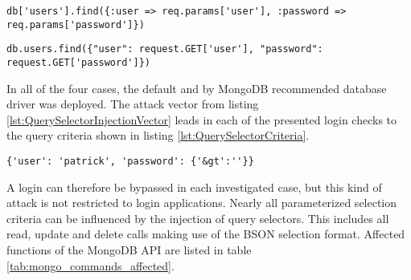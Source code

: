 \begin{lstlisting}[caption={Vulnerable Ruby example for query selector injection on MongoDB}, label={lst:RubyQuerySelectorInjection}]
db['users'].find({:user => req.params['user'], :password => req.params['password']})
\end{lstlisting}

\begin{lstlisting}[caption={Vulnerable Python example for query selector injection on MongoDB}, label={lst:PythonQuerySelectorInjection}]
db.users.find({"user": request.GET['user'], "password": request.GET['password']})
\end{lstlisting}

In all of the four cases, the default and by MongoDB recommended database driver was deployed. The attack vector from listing \ref{lst:QuerySelectorInjectionVector} leads in each of the presented login checks to the query criteria shown in listing \ref{lst:QuerySelectorCriteria}. \\

\begin{lstlisting}[caption={Resulting query of query selector injection}, label={lst:QuerySelectorCriteria}]
{'user': 'patrick', 'password': {'&gt':''}}
\end{lstlisting}

A login can therefore be bypassed in each investigated case, but this kind of attack is not restricted to login applications. Nearly all parameterized selection criteria can be influenced by the injection of query selectors. This includes all read, update and delete calls making use of the BSON selection format. Affected functions of the MongoDB API are listed in table \ref{tab:mongo_commands_affected}.\\


